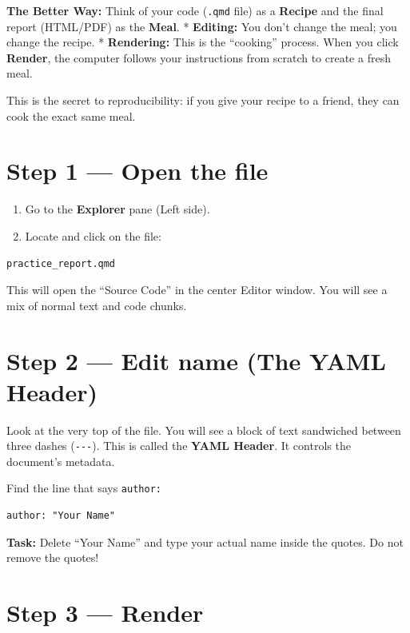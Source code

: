 \documentclass[
  letterpaper,
  DIV=11,
  numbers=noendperiod,
  oneside]{scrreprt}
\providecommand{\tightlist}{%
  \setlength{\itemsep}{0pt}\setlength{\parskip}{0pt}}
\begin{document}
\textbf{The Better Way:} Think of your code (\texttt{.qmd} file) as a
\textbf{Recipe} and the final report (HTML/PDF) as the \textbf{Meal}. *
\textbf{Editing:} You don't change the meal; you change the recipe. *
\textbf{Rendering:} This is the ``cooking'' process. When you click
\textbf{Render}, the computer follows your instructions from scratch to
create a fresh meal.

This is the secret to reproducibility: if you give your recipe to a
friend, they can cook the exact same meal.

\section{Step 1 --- Open the file}\label{step-1-open-the-file}

\begin{enumerate}
\def\labelenumi{\arabic{enumi}.}
\tightlist
\item
  Go to the \textbf{Explorer} pane (Left side).
\item
  Locate and click on the file:
\end{enumerate}

\begin{verbatim}
practice_report.qmd
\end{verbatim}

This will open the ``Source Code'' in the center Editor window. You will
see a mix of normal text and code chunks.

\section{Step 2 --- Edit name (The YAML
Header)}\label{step-2-edit-name-the-yaml-header}

Look at the very top of the file. You will see a block of text
sandwiched between three dashes (\texttt{-\/-\/-}). This is called the
\textbf{YAML Header}. It controls the document's metadata.

Find the line that says \texttt{author:}

\begin{verbatim}
author: "Your Name"
\end{verbatim}

\textbf{Task:} Delete ``Your Name'' and type your actual name inside the
quotes. Do not remove the quotes!

\section{Step 3 --- Render}\label{step-3-render}
\end{document}
